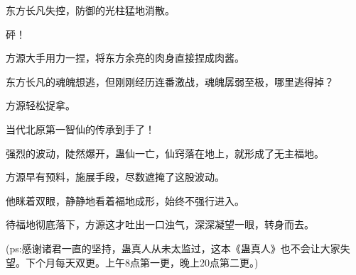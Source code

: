 \begin{this_body}
东方长凡失控，防御的光柱猛地消散。

砰！

方源大手用力一捏，将东方余亮的肉身直接捏成肉酱。

东方长凡的魂魄想逃，但刚刚经历连番激战，魂魄孱弱至极，哪里逃得掉？

方源轻松捉拿。

当代北原第一智仙的传承到手了！

强烈的波动，陡然爆开，蛊仙一亡，仙窍落在地上，就形成了无主福地。

方源早有预料，施展手段，尽数遮掩了这股波动。

他眯着双眼，静静地看着福地成形，始终不强行进入。

待福地彻底落下，方源这才吐出一口浊气，深深凝望一眼，转身而去。

(ps:感谢诸君一直的坚持，蛊真人从未太监过，这本《蛊真人》也不会让大家失望。下个月每天双更。上午8点第一更，晚上20点第二更。)

\end{this_body}

